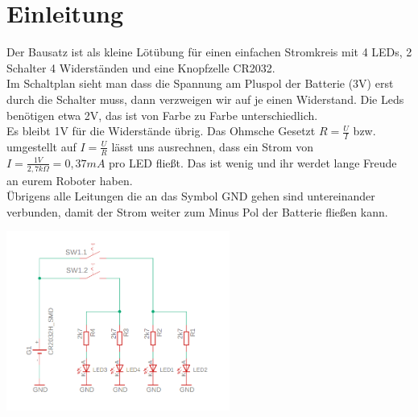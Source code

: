 \documentclass[a4paper]{article}
\begin{document}
\section{Einleitung}
Der Bausatz ist als kleine Lötübung für einen einfachen Stromkreis mit  4 LEDs, 2 Schalter 4 Widerständen und eine Knopfzelle CR2032.\\
Im Schaltplan sieht man dass die Spannung am Pluspol der Batterie (3V) erst durch die Schalter muss, dann verzweigen wir auf je einen Widerstand. Die Leds benötigen etwa 2V, das ist von Farbe zu Farbe unterschiedlich.\\ Es bleibt 1V für die Widerstände übrig. Das Ohmsche Gesetzt $R = \frac{U}{I}$ bzw. umgestellt auf $I = \frac{U}{R}$ lässt uns ausrechnen, dass ein Strom von $I = \frac{1V}{2,7 k\Omega} = 0,37 mA$ pro LED fließt. Das ist wenig und ihr werdet lange Freude an eurem Roboter haben.\\
 Übrigens alle Leitungen die an das Symbol GND gehen sind untereinander verbunden, damit der Strom weiter zum Minus Pol der Batterie fließen kann.
\ \\
\begin{minipage}[t]{\textwidth}
  \centering
  \includegraphics[width=0.55\textwidth]{../pictures/Schematic}
  \label{img:Schematic}
\end{minipage}
\end{document}
